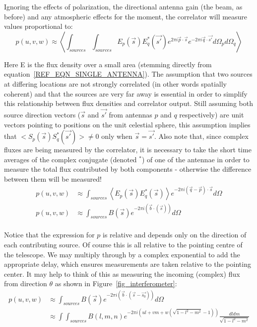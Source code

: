 Ignoring the effects of polarization, the directional antenna gain (the beam, as before) and any atmospheric effects
for the moment, the correlator will measure values proportional to:
\begin{equation*}
    p(u,v,w) \approx \left<\int_{sources}\int_{sources}{E_p(\vec{s})E_q^*(\vec{s'})e^{2\pi i\vec{p}\cdot\vec{s}}e^{-2\pi i\vec{q}\cdot\vec{s'}}d\Omega_pd\Omega_q}\right>     
\end{equation*}

Here E is the flux density over a small area (stemming directly from equation~\ref{REF_EQN_SINGLE_ANTENNA}). The assumption that two sources at differing locations are 
not strongly correlated (in other words spatially coherent) and that the sources are very far away is essential in order to simplify this relationship between flux densities 
and correlator output. Still assuming both source direction vectors ($\vec{s}$ and $\vec{s'}$ from antennas $p$ and $q$ respectively) are unit vectors pointing to positions 
on the unit celestial sphere, this assumption implies that $<S_p(\vec{s})S_q^*(\vec{s'})> \neq 0$ only when $\vec{s} = \vec{s'}$. Also note that, since complex fluxes 
are being measured by the correlator, it is necessary to take the short time averages of the complex conjugate (denoted $^{*}$)
of one of the antennae in order to measure the total flux contributed by both components - otherwise the difference between
them will be measured! 
\begin{equation*}
  \begin{split}
    p(u,v,w) &\approx \int_{sources}{\left<E_p(\vec{s})E_q^*(\vec{s})\right>e^{-2\pi i(\vec{q} - \vec{p})\cdot\vec{s}}d\Omega}\\
    p(u,v,w) &\approx \int_{sources}{B(\vec{s})e^{-2\pi i(\vec{b}\cdot(\vec{s}))}d\Omega}\\
  \end{split}
\end{equation*}

Notice that the expression for $p$ is relative and depends only on the direction of each contributing source. Of course this
is all relative to the pointing centre of the telescope. We may multiply through by a complex exponential to add the appropriate 
delay, which ensures measurements are taken relative to the pointing center. It may help to think of this as measuring the
incoming (complex) flux from direction $\theta$ as shown in Figure~\ref{fig_interferometer}:
\begin{equation}
 \label{EQN_ONE_CORR_RIME}
 \begin{split}
 p(u,v,w) &\approx \int_{sources}{B(\vec{s})e^{-2\pi i(\vec{b}\cdot(\vec{s}-\vec{s_0}))}d\Omega}\\
	  &\approx \int\int_{sources}{B(l,m,n)e^{-2\pi i(ul+vm+w(\sqrt{1-l^2-m^2}-1))}\frac{dldm}{\sqrt{1-l^2-m^2}}}\\
 \end{split}
\end{equation}

